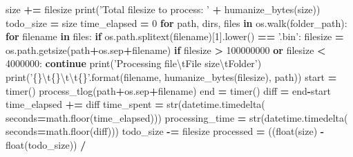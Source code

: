 \documentclass[12pt,oneside]{reedthesis}
\newenvironment{Shaded}{\begin{snugshade}}{\end{snugshade}}
\newcommand{\KeywordTok}[1]{\textcolor[rgb]{0.13,0.29,0.53}{\textbf{#1}}}
\newcommand{\DecValTok}[1]{\textcolor[rgb]{0.00,0.00,0.81}{#1}}
\newcommand{\CharTok}[1]{\textcolor[rgb]{0.31,0.60,0.02}{#1}}
\newcommand{\SpecialCharTok}[1]{\textcolor[rgb]{0.00,0.00,0.00}{#1}}
\newcommand{\StringTok}[1]{\textcolor[rgb]{0.31,0.60,0.02}{#1}}
\newcommand{\ControlFlowTok}[1]{\textcolor[rgb]{0.13,0.29,0.53}{\textbf{#1}}}
\newcommand{\OperatorTok}[1]{\textcolor[rgb]{0.81,0.36,0.00}{\textbf{#1}}}
\newcommand{\BuiltInTok}[1]{#1}
\newcommand{\NormalTok}[1]{#1}
\theoremstyle{definition}
\theoremstyle{definition}
\theoremstyle{definition}
\theoremstyle{remark}
\begin{document}
\begin{Shaded}
\begin{Highlighting}[]
\NormalTok{                    size }\OperatorTok{+=}\NormalTok{ filesize}
    \BuiltInTok{print}\NormalTok{(}\StringTok{'Total filesize to process: '} \OperatorTok{+}\NormalTok{ humanize_bytes(size))}
\NormalTok{    todo_size }\OperatorTok{=}\NormalTok{ size}
\NormalTok{    time_elapsed }\OperatorTok{=} \DecValTok{0}
    \ControlFlowTok{for}\NormalTok{ path, dirs, files }\KeywordTok{in}\NormalTok{ os.walk(folder_path):}
        \ControlFlowTok{for}\NormalTok{ filename }\KeywordTok{in}\NormalTok{ files:}
            \ControlFlowTok{if}\NormalTok{ os.path.splitext(filename)[}\DecValTok{1}\NormalTok{].lower() }\OperatorTok{==} \StringTok{'.bin'}\NormalTok{:}
\NormalTok{                filesize }\OperatorTok{=}\NormalTok{ os.path.getsize(path}\OperatorTok{+}\NormalTok{os.sep}\OperatorTok{+}\NormalTok{filename)}
                \ControlFlowTok{if}\NormalTok{ filesize }\OperatorTok{>} \DecValTok{100000000} \KeywordTok{or}\NormalTok{ filesize }\OperatorTok{<} \DecValTok{4000000}\NormalTok{:}
                    \ControlFlowTok{continue}
                \BuiltInTok{print}\NormalTok{(}\StringTok{'Processing file}\CharTok{\textbackslash{}t}\StringTok{File size}\CharTok{\textbackslash{}t}\StringTok{Folder'}\NormalTok{)}
                \BuiltInTok{print}\NormalTok{(}\StringTok{'}\SpecialCharTok{\{\}}\CharTok{\textbackslash{}t}\SpecialCharTok{\{\}}\CharTok{\textbackslash{}t\textbackslash{}t}\SpecialCharTok{\{\}}\StringTok{'}\NormalTok{.}\BuiltInTok{format}\NormalTok{(filename, }
\NormalTok{                  humanize_bytes(filesize), path))}
\NormalTok{                start }\OperatorTok{=}\NormalTok{ timer()}
\NormalTok{                process_tlog(path}\OperatorTok{+}\NormalTok{os.sep}\OperatorTok{+}\NormalTok{filename)    }
\NormalTok{                end }\OperatorTok{=}\NormalTok{ timer()}
\NormalTok{                diff }\OperatorTok{=}\NormalTok{ end}\OperatorTok{-}\NormalTok{start}
\NormalTok{                time_elapsed }\OperatorTok{+=}\NormalTok{ diff}
\NormalTok{                time_spent }\OperatorTok{=} \BuiltInTok{str}\NormalTok{(datetime.timedelta(}
\NormalTok{                  seconds}\OperatorTok{=}\NormalTok{math.floor(time_elapsed)))}
\NormalTok{                processing_time }\OperatorTok{=} \BuiltInTok{str}\NormalTok{(datetime.timedelta(}
\NormalTok{                  seconds}\OperatorTok{=}\NormalTok{math.floor(diff)))}
\NormalTok{                todo_size }\OperatorTok{-=}\NormalTok{ filesize}
\NormalTok{                processed }\OperatorTok{=}\NormalTok{ ((}\BuiltInTok{float}\NormalTok{(size) }\OperatorTok{-} \BuiltInTok{float}\NormalTok{(todo_size)) }\OperatorTok{/} 

\end{Highlighting}
\end{Shaded}
\end{document}
